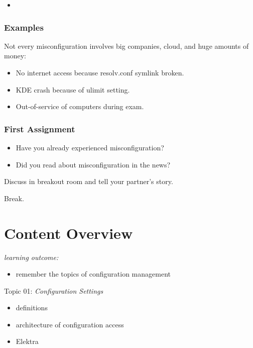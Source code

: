 {\begin{frame}
\begin{itemize}
		\item   \textcolor{white}{}
			\textcolor{white}{}
	\end{itemize}
\end{frame}
\begin{frame}
	\frametitle{Examples}
	Not every misconfiguration involves big companies, cloud, and huge amounts of money:
	\begin{itemize}
		\item No internet access because resolv.conf symlink broken.
		\item KDE crash because of ulimit setting.
		\item Out-of-service of computers during exam.
	\end{itemize}
\end{frame}
}
\begin{assignment}
	\frametitle{First Assignment}
	\begin{itemize}
		\item Have you already experienced misconfiguration?
		\item Did you read about misconfiguration in the news?
	\end{itemize}
	\begin{task}
	Discuss in breakout room and tell your partner's story.
	\end{task}
\end{assignment}

\begin{assignment}
	\begin{task}
	Break.
	\end{task}
\end{assignment}

\section{Content Overview}

\begin{frame}
	\textit{learning outcome:}
	\begin{itemize}
		\item remember the topics of configuration management
	\end{itemize}
\end{frame}

\begin{frame}
	Topic 01: \textit{Configuration Settings}
	\begin{itemize}
		\item definitions
		\item architecture of configuration access
		\item Elektra
	\end{itemize}
\end{frame}

